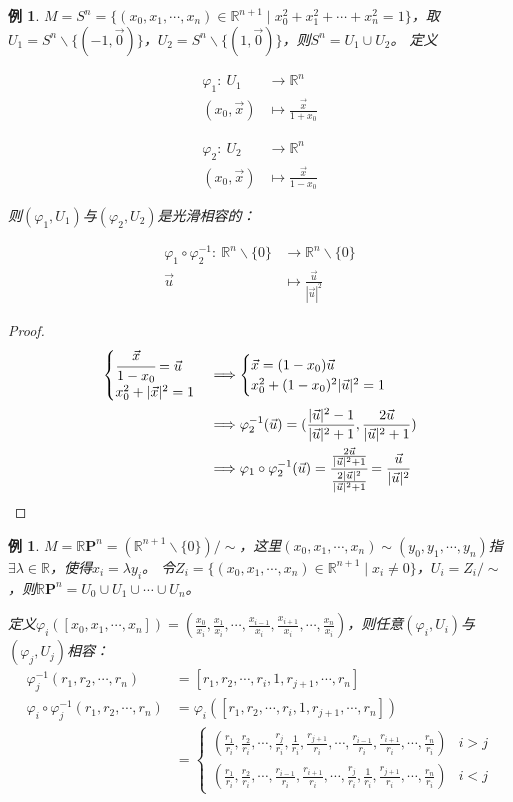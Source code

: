 \documentclass[winfonts,UTF8,c5size,a4paper,fancyhdr,hyperref,titlepage,nocap]{ctexart}
\newtheorem{exa}[thm]{例}
\theoremstyle{definition}
\theoremstyle{remark}
\numberwithin{equation}{subsection}
\newcommand{\Real}{\mathbb{R}}
\newcommand{\RP}{\mathbb{R}\mathbf{P}}
\newcommand{\mapdes}[5]
  {
    \begin{align*}
      #1\colon\  #2 & \longrightarrow  #3 \\
            #4 & \mapsto  #5
    \end{align*}
  }
\begin{document}
\begin{exa}
  $M=S^n=\{(x_0,x_1,\cdots,x_n)\in\Real^{n+1}\mid x^2_0+x^2_1+\cdots+x^2_n=1\}$，取$U_1=S^n\backslash\{(-1,\vec{0})\}$，$U_2=S^n\backslash\{(1,\vec{0})\}$，则$S^n=U_1\cup U_2$。 定义
  \begin{center}
  \parbox{0.4\linewidth}{\mapdes{\varphi_1}{U_1}{\Real^n}{(x_0,\vec{x})}{\frac{\vec{x}}{1+x_0}}}
  \parbox{0.4\linewidth}{\mapdes{\varphi_2}{U_2}{\Real^n}{(x_0,\vec{x})}{\frac{\vec{x}}{1-x_0}}}
  \end{center}
  则$(\varphi_1,U_1)$与$(\varphi_2,U_2)$是光滑相容的：
  \mapdes{\varphi_1\circ\varphi^{-1}_2}{\Real^n\backslash\{0\}}{\Real^n\backslash\{0\}}{\vec{u}}{\frac{\vec{u}}{|\vec{u}|^2}}
\end{exa}
\begin{proof}
\begin{align*}
    \begin{cases}
    \cfrac{\vec{x}}{1-x_0}=\vec{u}\\
    x_0^2+|\vec{x}|^2=1
    \end{cases}
    &\Longrightarrow
    \begin{cases}
    \vec{x}=(1-x_0)\vec{u}\\
    x_0^2+(1-x_0)^2|\vec{u}|^2=1
    \end{cases}
    \\
  &\Longrightarrow \varphi^{-1}_2(\vec{u})=(\frac{|\vec{u}|^2-1}{|\vec{u}|^2+1},\frac{2\vec{u}}{|\vec{u}|^2+1}) \\
  &\Longrightarrow \varphi_1\circ\varphi^{-1}_2(\vec{u})=\cfrac{\frac{2\vec{u}}{|\vec{u}|^2+1}}{\frac{2|\vec{u}|^2}{|\vec{u}|^2+1}}=\frac{\vec{u}}{|\vec{u}|^2}
\end{align*}
\end{proof}
\begin{exa}
  $M=\RP^n=(\Real^{n+1}\backslash\{0\})/\sim$，这里$(x_0,x_1,\cdots,x_n)\sim(y_0,y_1,\cdots,y_n)$指$\exists\lambda\in\Real$，使得$x_i=\lambda y_i$。
令$Z_i=\{(x_0,x_1,\cdots,x_n)\in\Real^{n+1}\mid x_i\neq0\}$，$U_i=Z_i/\sim$，则$\RP^n=U_0\cup U_1\cup\cdots\cup U_n$。

定义$\varphi_i([x_0,x_1,\cdots,x_n])=(\frac{x_0}{x_i},\frac{x_1}{x_i},\cdots,\frac{x_{i-1}}{x_i},\frac{x_{i+1}}{x_i},\cdots,\frac{x_n}{x_i})$，则任意$(\varphi_i,U_i)$与$(\varphi_j,U_j)$相容：
\begin{align*}
  \varphi_j^{-1}(r_1,r_2,\cdots,r_n)&=[r_1,r_2,\cdots,r_i,1,r_{j+1},\cdots,r_n] \\
  \varphi_i\circ\varphi_j^{-1}(r_1,r_2,\cdots,r_n)&=\varphi_i([r_1,r_2,\cdots,r_i,1,r_{j+1},\cdots,r_n])\\
  &=\begin{cases}
  (\frac{r_1}{r_i},\frac{r_2}{r_i},\cdots,\frac{r_j}{r_i},\frac{1}{r_i},\frac{r_{j+1}}{r_i},\cdots,\frac{r_{i-1}}{r_i},\frac{r_{i+1}}{r_i},\cdots,\frac{r_n}{r_i})&i>j\\
  (\frac{r_1}{r_i},\frac{r_2}{r_i},\cdots,\frac{r_{i-1}}{r_i},\frac{r_{i+1}}{r_i},\cdots,\frac{r_j}{r_i},\frac{1}{r_i},\frac{r_{j+1}}{r_i},\cdots,\frac{r_n}{r_i})&i<j
  \end{cases}
\end{align*}
\end{exa}
\end{document}
